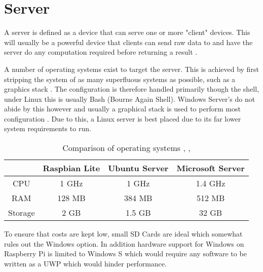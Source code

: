 \section{Server}

A server is defined as a device that can serve one or more "client" devices. This will usually be a powerful device that clients can send raw data to and have the server do any computation required before returning a result \citep{Raymond2003}.

A number of operating systems exist to target the server. This is achieved by first stripping the system of as many superfluous systems as possible, such as a graphics stack \citep{Guide2016}. The configuration is therefore handled primarily though the shell, under Linux this is usually Bash (Bourne Again Shell). Windows Server's do not abide by this however and usually a graphical stack is used to perform most configuration \citep{MicrosoftCorporation2017}. Due to this, a Linux server is best placed due to its far lower system requirements to run.\\
\begin{table}[H]
	\centering
	\begin{tabular}{cccc}
		\hline 
		& \textbf{Raspbian Lite} & \textbf{Ubuntu Server} & \textbf{Microsoft Server} \\ 
		\hline 
		CPU & 1 GHz & 1 GHz & 1.4 GHz \\ 
		RAM & 128 MB & 384 MB & 512 MB \\ 
		Storage & 2 GB & 1.5 GB & 32 GB \\ 
		\hline 
	\end{tabular}
	\caption{ Comparison of operating systems \citep{Debian2018}, \citep{Guide2016}, \citep{MicrosoftCorporation2018}}
	\label{fig:oscompare}
\end{table}
To ensure that costs are kept low, small SD Cards are ideal which somewhat rules out the Windows option. In addition hardware support for Windows on Raspberry Pi is limited to Windows S \citep{MicrosoftCorporation2017b} which would require any software to be written as a UWP \citep{MicrosoftCorporation2017a} which would hinder performance.
